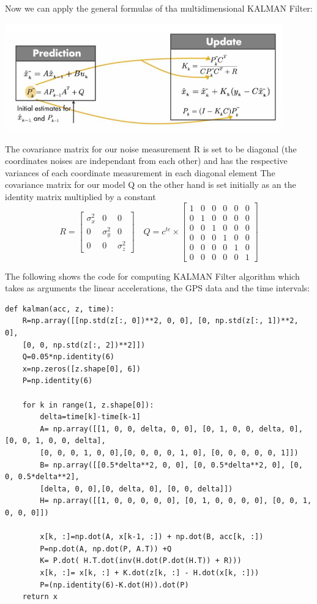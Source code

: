 \documentclass[12pt,a4paper]{report}
\begin{document}
Now we can apply the general formulas of tha multidimensional KALMAN Filter:
\begin{center}
\includegraphics[width=12cm]{Capture2.png}
\end{center}

The covariance matrix for our noise measurement R is set to be diagonal (the coordinates noises are independant from each other) and has the respective variances of each coordinate measurement in each diagonal element
The covariance matrix for our model Q on the other hand is set initially as an the identity matrix multiplied by a constant 
$$R= \left[ \begin{array}{ccc}
 \sigma_x^{2}& 0 & 0 \\0 & \sigma_y^{2} & 0 \\ 0& 0 & \sigma_z^{2} \end{array}\right] 
\quad Q= c^{te} \times \left[ \begin{array}{cccccc}
 1& 0 & 0& 0& 0& 0 \\0& 1 & 0& 0& 0& 0 \\0& 0 & 1& 0& 0& 0 \\0& 0 & 0& 1& 0& 0\\ 0& 0 & 0& 0& 1& 0\\0& 0 & 0& 0& 0& 1 \end{array}\right]$$

The following shows the code for computing KALMAN Filter algorithm which takes as arguments the linear accelerations, the GPS data and the time intervals:
\begin{verbatim}
def kalman(acc, z, time):
    R=np.array([[np.std(z[:, 0])**2, 0, 0], [0, np.std(z[:, 1])**2, 0], 
    [0, 0, np.std(z[:, 2])**2]])
    Q=0.05*np.identity(6)        
    x=np.zeros([z.shape[0], 6])
    P=np.identity(6)
    
    for k in range(1, z.shape[0]):
        delta=time[k]-time[k-1]        
        A= np.array([[1, 0, 0, delta, 0, 0], [0, 1, 0, 0, delta, 0], [0, 0, 1, 0, 0, delta], 
        [0, 0, 0, 1, 0, 0],[0, 0, 0, 0, 1, 0], [0, 0, 0, 0, 0, 1]])
        B= np.array([[0.5*delta**2, 0, 0], [0, 0.5*delta**2, 0], [0, 0, 0.5*delta**2], 
        [delta, 0, 0],[0, delta, 0], [0, 0, delta]])
        H= np.array([[1, 0, 0, 0, 0, 0], [0, 1, 0, 0, 0, 0], [0, 0, 1, 0, 0, 0]])
        
        x[k, :]=np.dot(A, x[k-1, :]) + np.dot(B, acc[k, :])
        P=np.dot(A, np.dot(P, A.T)) +Q                
        K= P.dot( H.T.dot(inv(H.dot(P.dot(H.T)) + R)))        
        x[k, :]= x[k, :] + K.dot(z[k, :] - H.dot(x[k, :]))        
        P=(np.identity(6)-K.dot(H)).dot(P)        
    return x\end{verbatim}
\end{document}
